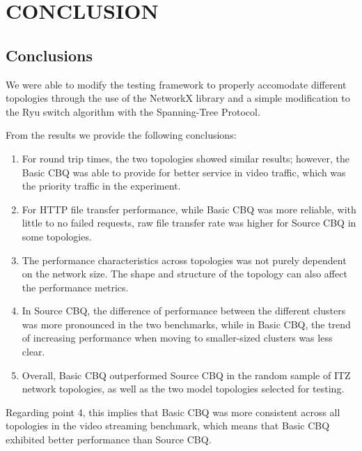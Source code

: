 \chapter{CONCLUSION}
\section{Conclusions}
We were able to modify the testing framework to properly accomodate different topologies through the use of the NetworkX library and a simple modification to the Ryu switch algorithm with the Spanning-Tree Protocol.

From the results we provide the following conclusions:
\begin{enumerate}
    \item For round trip times, the two topologies showed similar results; however, the Basic CBQ was able to provide for better service in video traffic, which was the priority traffic in the experiment.
    \item For HTTP file transfer performance, while Basic CBQ was more reliable, with little to no failed requests, raw file transfer rate was higher for Source CBQ in some topologies. 
    \item The performance characteristics across topologies was not purely dependent on the network size. The shape and structure of the topology can also affect the performance metrics.
    \item In Source CBQ, the difference of performance between the different clusters was more pronounced in the two benchmarks, while in Basic CBQ, the trend of increasing performance when moving to smaller-sized clusters was less clear.
    \item Overall, Basic CBQ outperformed Source CBQ in the random sample of ITZ network topologies, as well as the two model topologies selected for testing. 
\end{enumerate}
Regarding point 4, this implies that Basic CBQ was more consistent across all topologies in the video streaming benchmark, which means that Basic CBQ exhibited better performance than Source CBQ.

